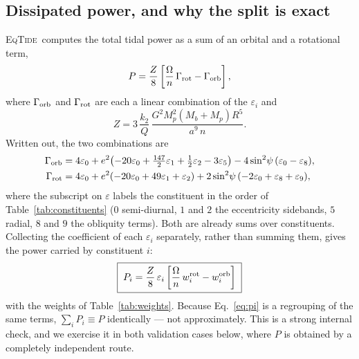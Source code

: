 \documentclass[11pt]{article}
\newcommand{\eqtide}{\textsc{EqTide}}
\newcommand{\Om}{\Omega}
\begin{document}
\subsection{Dissipated power, and why the split is exact}

\eqtide\ computes the total tidal power as a sum of an orbital and a
rotational term,
\begin{equation}
  P = \frac{Z}{8}\left[\frac{\Om}{n}\,\Gamma_{\rm rot} - \Gamma_{\rm orb}\right],
  \label{eq:ptot}
\end{equation}
where $\Gamma_{\rm orb}$ and $\Gamma_{\rm rot}$ are each a linear combination
of the $\varepsilon_i$ and
\begin{equation}
  Z = 3\,\frac{k_2}{Q}\,
      \frac{G^2 M_p^2 (M_b+M_p) R^5}{a^9\,n}.
  \label{eq:Z}
\end{equation}
Written out, the two combinations are
\begin{align}
  \Gamma_{\rm orb} &= 4\varepsilon_0
    + e^2\!\left(-20\varepsilon_0 + \tfrac{147}{2}\varepsilon_1
      + \tfrac12\varepsilon_2 - 3\varepsilon_5\right)
    - 4\sin^2\!\psi\,(\varepsilon_0 - \varepsilon_8), \\
  \Gamma_{\rm rot} &= 4\varepsilon_0
    + e^2\!\left(-20\varepsilon_0 + 49\varepsilon_1 + \varepsilon_2\right)
    + 2\sin^2\!\psi\,(-2\varepsilon_0 + \varepsilon_8 + \varepsilon_9),
\end{align}
where the subscript on $\varepsilon$ labels the constituent in the order of
Table~\ref{tab:constituents} ($0$ semi-diurnal, $1$ and $2$ the eccentricity
sidebands, $5$ radial, $8$ and $9$ the obliquity terms). Both are already sums
over constituents. Collecting the coefficient of each $\varepsilon_i$
separately, rather than summing them, gives the power carried by constituent
$i$:
\begin{equation}
  \boxed{\;
  P_i = \frac{Z}{8}\,\varepsilon_i
        \left[\frac{\Om}{n}\,w^{\rm rot}_i - w^{\rm orb}_i\right] \;}
  \label{eq:pi}
\end{equation}
with the weights of Table~\ref{tab:weights}. Because Eq.~\eqref{eq:pi} is a
regrouping of the same terms, $\sum_i P_i \equiv P$ identically --- not
approximately. This is a strong internal check, and we exercise it in both
validation cases below, where $P$ is obtained by a completely independent
route.
\end{document}
